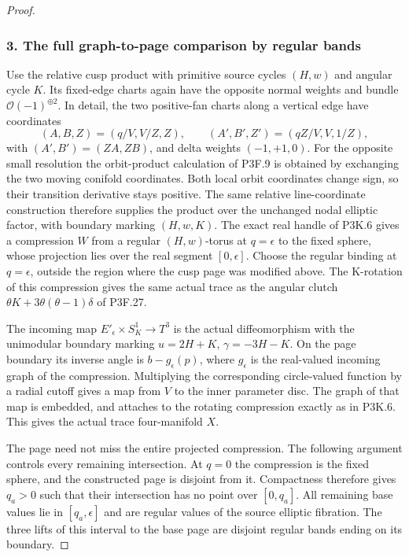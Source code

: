 \begin{proof}
\subsubsection{3. The full graph-to-page comparison by regular bands}\label{the-full-graph-to-page-comparison-by-regular-bands}

Use the relative cusp product with primitive source cycles \((H,w)\) and angular cycle \(K\). Its fixed-edge charts again have the opposite normal weights and bundle \(\mathcal O(-1)^{\oplus2}\). In detail, the two positive-fan charts along a vertical edge have coordinates \[
 (A,B,Z)=(q/V,V/Z,Z),\qquad
 (A',B',Z')=(qZ/V,V,1/Z),
\] with \((A',B')=(ZA,ZB)\), and delta weights \((-1,+1,0)\). For the opposite small resolution the orbit-product calculation of P3F.9 is obtained by exchanging the two moving conifold coordinates. Both local orbit coordinates change sign, so their transition derivative stays positive. The same relative line-coordinate construction therefore supplies the product over the unchanged nodal elliptic factor, with boundary marking \((H,w,K)\). The exact real handle of P3K.6 gives a compression \(W\) from a regular \((H,w)\)-torus at \(q=\epsilon\) to the fixed sphere, whose projection lies over the real segment \([0,\epsilon]\). Choose the regular binding at \(q=\epsilon\), outside the region where the cusp page was modified above. The K-rotation of this compression gives the same actual trace as the angular clutch \(\theta K+3\theta(\theta-1)\delta\) of P3F.27.

The incoming map \(E'_\epsilon\times S^1_K\to T^3\) is the actual diffeomorphism with the unimodular boundary marking \(u=2H+K\), \(\gamma=-3H-K\). On the page boundary its inverse angle is \(b-g_\epsilon(p)\), where \(g_\epsilon\) is the real-valued incoming graph of the compression. Multiplying the corresponding circle-valued function by a radial cutoff gives a map from \(V\) to the inner parameter disc. The graph of that map is embedded, and attaches to the rotating compression exactly as in P3K.6. This gives the actual trace four-manifold \(X\).

The page need not miss the entire projected compression. The following argument controls every remaining intersection. At \(q=0\) the compression is the fixed sphere, and the constructed page is disjoint from it. Compactness therefore gives \(q_a>0\) such that their intersection has no point over \([0,q_a]\). All remaining base values lie in \([q_a,\epsilon]\) and are regular values of the source elliptic fibration. The three lifts of this interval to the base page are disjoint regular bands ending on its boundary.


\end{proof}
